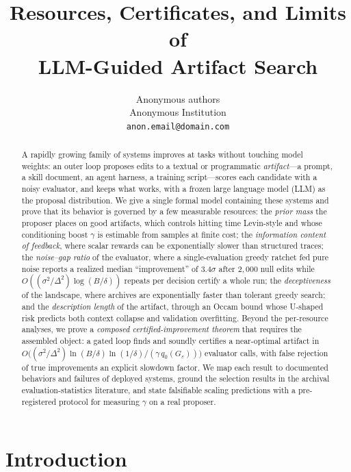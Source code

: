 \documentclass{article}
\title{Resources, Certificates, and Limits of\\ LLM-Guided Artifact Search}
\author{Anonymous authors\\
Anonymous Institution\\
\texttt{anon.email@domain.com}}
\theoremstyle{plain}
\theoremstyle{definition}
\theoremstyle{remark}
\newcommand{\eps}{\varepsilon}
\begin{document}
\maketitle

\begin{abstract}
A rapidly growing family of systems improves at tasks without touching model weights: an outer loop proposes edits to a textual or programmatic \emph{artifact}---a prompt, a skill document, an agent harness, a training script---scores each candidate with a noisy evaluator, and keeps what works, with a frozen large language model (LLM) as the proposal distribution. We give a single formal model containing these systems and prove that its behavior is governed by a few measurable resources: the \emph{prior mass} the proposer places on good artifacts, which controls hitting time Levin-style and whose conditioning boost $\gamma$ is estimable from samples at finite cost; the \emph{information content of feedback}, where scalar rewards can be exponentially slower than structured traces; the \emph{noise--gap ratio} of the evaluator, where a single-evaluation greedy ratchet fed pure noise reports a realized median ``improvement'' of $3.4\sigma$ after $2{,}000$ null edits while $O((\sigma^2/\Delta^2)\log(B/\delta))$ repeats per decision certify a whole run; the \emph{deceptiveness} of the landscape, where archives are exponentially faster than tolerant greedy search; and the \emph{description length} of the artifact, through an Occam bound whose U-shaped risk predicts both context collapse and validation overfitting. Beyond the per-resource analyses, we prove a \emph{composed certified-improvement theorem} that requires the assembled object: a gated loop finds and soundly certifies a near-optimal artifact in $O\big((\sigma^2/\Delta^2)\ln(B/\delta)\ln(1/\delta)/(\gamma\,q_0(G_\eps))\big)$ evaluator calls, with false rejection of true improvements an explicit slowdown factor. We map each result to documented behaviors and failures of deployed systems, ground the selection results in the archival evaluation-statistics literature, and state falsifiable scaling predictions with a pre-registered protocol for measuring $\gamma$ on a real proposer.
\end{abstract}

\section{Introduction}
\label{sec:intro}
\end{document}
